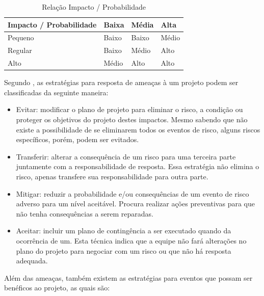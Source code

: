   \begin{table}[!htbp]
    \begin{center}
    \caption{\label{impactoporprobabilidade}Relação Impacto / Probabilidade}
    \begin{tabular}{|l|l|l|l|}
    \hline
    \textbf{Impacto / Probabilidade} & \textbf{Baixa} & \textbf{Média} & \textbf{Alta} \\ \hline\hline
    Pequeno                          & Baixo          & Baixo          & Médio         \\ \hline
    Regular                          & Baixo          & Médio          & Alto          \\ \hline
    Alto                             & Médio          & Alto           & Alto          \\ \hline
    \end{tabular}
    \end{center}
  \end{table}

  Segundo \cite{scofanogestao}, as estratégias para resposta de ameaças à um projeto podem ser classificadas da seguinte maneira:

  \begin{itemize}
    \item Evitar: modificar o plano de projeto para eliminar o risco, a condição ou proteger os objetivos do projeto destes
    impactos. Mesmo sabendo que não existe a possibilidade de se eliminarem todos os eventos de risco, alguns riscos
    específicos, porém, podem ser evitados.
    \item Transferir: alterar a consequência de um risco para uma terceira parte juntamente com a responsabilidade de
    resposta. Essa estratégia não elimina o risco, apenas transfere sua responsabilidade para outra parte.
    \item Mitigar: reduzir a probabilidade e/ou consequências de um evento de risco adverso para um nível aceitável. Procura
    realizar ações preventivas para que não tenha consequências a serem reparadas.
    \item Aceitar: incluir um plano de contingência a ser executado quando da ocorrência de um. Esta técnica indica que a equipe
    não fará alterações no plano do projeto para negociar com um risco ou que não há resposta adequada.
  \end{itemize}

  Além das ameaças, também existem as estratégias para eventos que possam ser benéficos ao projeto, as quais são:

